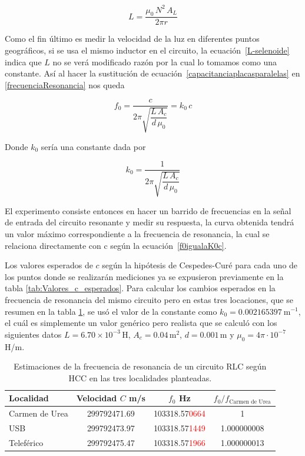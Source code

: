 \begin{equation} \label{L-selenoide}
L=\frac{\mu_0\,N^{2}\,A_L}{2\pi r}
\end{equation}

Como el fin último es medir la velocidad de la luz en diferentes puntos geográficos, si se usa el mismo inductor en el circuito, la ecuación~\ref{L-selenoide} indica que $L$ no se verá modificado razón por la cual lo tomamos como una constante. Así al hacer la sustitución de ecuación~\ref{capacitanciaplacasparalelas} en \eqref{frecuenciaResonancia} nos queda

\begin{equation} \label{f0igualaK0c}
f_0=\frac{c}{2\pi\sqrt{\dfrac{L\,A_c}{d\,\mu_0}}}=k_0\,c
\end{equation}

Donde $k_0$ sería una constante dada por

\begin{equation}
k_0=\frac{1}{2\pi\sqrt{\dfrac{L\,A_c}{d\,\mu_0}}}
\end{equation}

El experimento consiste entonces en hacer un barrido de frecuencias en la señal de entrada del circuito resonante y medir su respuesta, la curva obtenida tendrá un valor máximo correspondiente a la frecuencia de resonancia, la cual se relaciona directamente con c según la ecuación~\ref{f0igualaK0c}. 

Los valores esperados de $c$ según la hipótesis de Cespedes-Curé para cada uno de los puntos donde se realizarán mediciones ya se expusieron previamente en la tabla \ref{tab:Valores_c_esperados}. Para calcular los cambios esperados en la frecuencia de resonancia del mismo circuito pero en estas tres locaciones, que se resumen en la tabla \ref{tab:estimacionesdef0segunHCC},  se usó el valor de la constante como $k_0=0.002165397~\text{m}^{-1}$, el cuál es simplemente un valor genérico pero realista que se calculó con los siguientes datos $L=6.70\times 10^{-3}\,\text{H}$, $A_c=0.04\,\text{m}^{2}$, $d=0.001\,\text{m}$ y $\mu_0=4\pi\cdot 10^{-7} $ H/m.

\begin{table}[h!]
\centering
\begin{tabular}{lccc}
\toprule
Localidad & Velocidad $C$ m/s & $f_0$ Hz & $f_0/f_{\text{Carmen de Urea}}$\\
\midrule
Carmen de Urea & 299792471.69 & 103318.57\textcolor{red}{0664} & 1\\
USB            & 299792473.97 & 103318.57\textcolor{red}{1449} & 1.000000008\\
Teleférico     & 299792475.47 & 103318.57\textcolor{red}{1966} & 1.000000013\\
\bottomrule
\end{tabular}
\caption{Estimaciones de la frecuencia de resonancia de un circuito RLC según \ac{HCC} en las tres localidades planteadas.}\label{tab:estimacionesdef0segunHCC}
\end{table}

